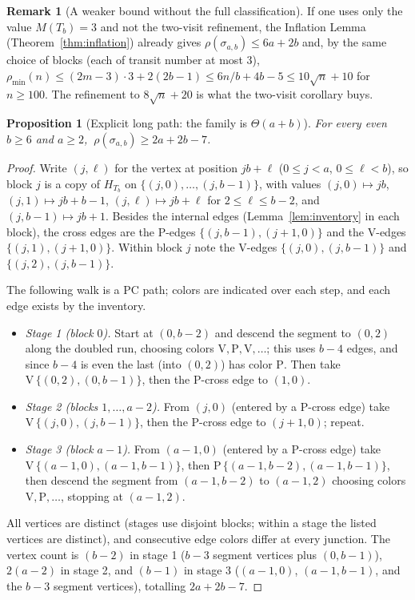 \documentclass[11pt]{article}
\newtheorem{proposition}[theorem]{Proposition}
\theoremstyle{definition}
\newtheorem{remark}[theorem]{Remark}
\newcommand{\pmin}{\rho_{\min}}
\begin{document}
\begin{remark}[A weaker bound without the full classification]\label{rem:crude}
If one uses only the value $M(T_b) = 3$ and not the two-visit refinement, the Inflation
Lemma (Theorem~\ref{thm:inflation}) already gives $\rho(\sigma_{a,b}) \le 6a + 2b$ and,
by the same choice of blocks (each of transit number at most $3$),
$\pmin(n) \le (2m-3)\cdot 3 + 2(2b-1) \le 6n/b + 4b - 5 \le 10\sqrt n + 10$ for
$n \ge 100$. The refinement to $8\sqrt n + 20$ is what the two-visit corollary buys.
\end{remark}

\begin{proposition}[Explicit long path: the family is $\Theta(a+b)$]\label{prop:lower}
For every even $b \ge 6$ and $a \ge 2$, $\ \rho(\sigma_{a,b}) \ge 2a + 2b - 7$.
\end{proposition}

\begin{proof}
Write $(j, \ell)$ for the vertex at position $jb + \ell$ ($0 \le j < a$,
$0 \le \ell < b$), so block $j$ is a copy of $H_{T_b}$ on $\{(j,0), \dots, (j,b-1)\}$,
with values $(j,0) \mapsto jb$, $(j,1) \mapsto jb + b - 1$, $(j,\ell) \mapsto jb + \ell$
for $2 \le \ell \le b-2$, and $(j, b-1) \mapsto jb + 1$. Besides the internal edges
(Lemma~\ref{lem:inventory} in each block), the cross edges are the P-edges
$\{(j, b-1), (j+1, 0)\}$ and the V-edges $\{(j, 1), (j+1, 0)\}$. Within block $j$ note
the V-edges $\{(j,0), (j,b-1)\}$ and $\{(j,2), (j,b-1)\}$.

The following walk is a PC path; colors are indicated over each step, and each edge
exists by the inventory.
\begin{itemize}
\item \emph{Stage 1 (block $0$).} Start at $(0, b-2)$ and descend the segment to
$(0, 2)$ along the doubled run, choosing colors $\mathrm V, \mathrm P, \mathrm V, \dots$;
this uses $b - 4$ edges, and since $b - 4$ is even the last (into $(0,2)$) has color
$\mathrm P$. Then take $\mathrm V\,\{(0,2), (0,b-1)\}$, then the P-cross edge to
$(1, 0)$.
\item \emph{Stage 2 (blocks $1, \dots, a-2$).} From $(j, 0)$ (entered by a P-cross
edge) take $\mathrm V\,\{(j,0), (j,b-1)\}$, then the P-cross edge to $(j+1, 0)$; repeat.
\item \emph{Stage 3 (block $a-1$).} From $(a-1, 0)$ (entered by a P-cross edge) take
$\mathrm V\,\{(a-1,0), (a-1,b-1)\}$, then $\mathrm P\,\{(a-1,b-2), (a-1,b-1)\}$, then
descend the segment from $(a-1, b-2)$ to $(a-1, 2)$ choosing colors
$\mathrm V, \mathrm P, \dots$, stopping at $(a-1, 2)$.
\end{itemize}
All vertices are distinct (stages use disjoint blocks; within a stage the listed
vertices are distinct), and consecutive edge colors differ at every junction. The vertex
count is $(b - 2)$ in stage 1 ($b-3$ segment vertices plus $(0, b-1)$), $2(a-2)$ in
stage 2, and $(b - 1)$ in stage 3 ($(a-1,0)$, $(a-1,b-1)$, and the $b-3$ segment
vertices), totalling $2a + 2b - 7$.
\end{proof}
\end{document}

